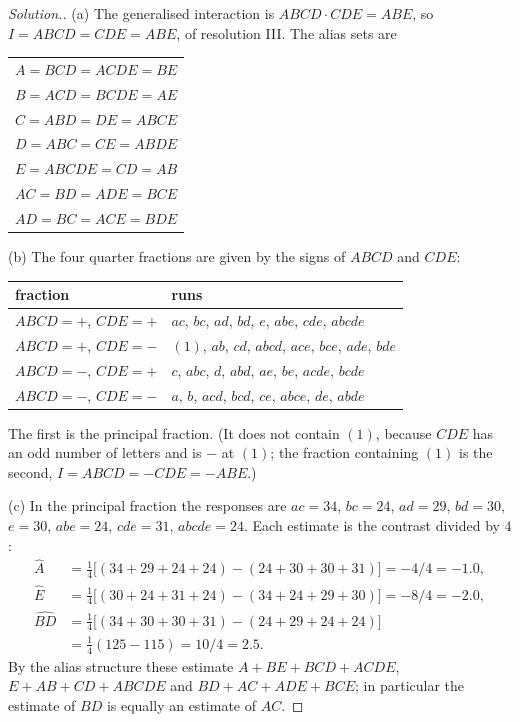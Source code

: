 \documentclass[11pt,a4paper]{article}
\numberwithin{equation}{section}
\theoremstyle{definition}
\newenvironment{solution}
  {\renewcommand{\qedsymbol}{}\begin{proof}[\textit{Solution}.]}
  {\end{proof}}
\begin{document}
\begin{solution}
(a) The generalised interaction is $ABCD \cdot CDE = ABE$, so $I = ABCD = CDE = ABE$, of resolution III. The alias sets are
\begin{center}
\begin{tabular}{l}
$A = BCD = ACDE = BE$ \\
$B = ACD = BCDE = AE$ \\
$C = ABD = DE = ABCE$ \\
$D = ABC = CE = ABDE$ \\
$E = ABCDE = CD = AB$ \\
$AC = BD = ADE = BCE$ \\
$AD = BC = ACE = BDE$
\end{tabular}
\end{center}

(b) The four quarter fractions are given by the signs of $ABCD$ and $CDE$:
\begin{center}
\begin{tabular}{l|l}
fraction & runs \\
\hline
$ABCD = +$, $CDE = +$ & $ac$, $bc$, $ad$, $bd$, $e$, $abe$, $cde$, $abcde$ \\
$ABCD = +$, $CDE = -$ & $(1)$, $ab$, $cd$, $abcd$, $ace$, $bce$, $ade$, $bde$ \\
$ABCD = -$, $CDE = +$ & $c$, $abc$, $d$, $abd$, $ae$, $be$, $acde$, $bcde$ \\
$ABCD = -$, $CDE = -$ & $a$, $b$, $acd$, $bcd$, $ce$, $abce$, $de$, $abde$
\end{tabular}
\end{center}
The first is the principal fraction. (It does not contain $(1)$, because $CDE$ has an odd number of letters and is $-$ at $(1)$; the fraction containing $(1)$ is
the second, $I = ABCD = -CDE = -ABE$.)

(c) In the principal fraction the responses are $ac = 34$, $bc = 24$, $ad = 29$, $bd = 30$, $e = 30$, $abe = 24$, $cde = 31$, $abcde = 24$. Each estimate is the contrast divided by $4$:
\begin{align*}
\hat A &= \tfrac14\bigl[(34 + 29 + 24 + 24) - (24 + 30 + 30 + 31)\bigr] = -4/4 = -1.0 , \\
\hat E &= \tfrac14\bigl[(30 + 24 + 31 + 24) - (34 + 24 + 29 + 30)\bigr] = -8/4 = -2.0 , \\
\widehat{BD} &= \tfrac14\bigl[(34 + 30 + 30 + 31) - (24 + 29 + 24 + 24)\bigr] \\
&= \tfrac14(125 - 115) = 10/4 = 2.5 .
\end{align*}
By the alias structure these estimate $A + BE + BCD + ACDE$, $E + AB + CD + ABCDE$ and $BD + AC + ADE + BCE$; in particular the estimate of $BD$ is equally an
estimate of $AC$.
\end{solution}
\end{document}
